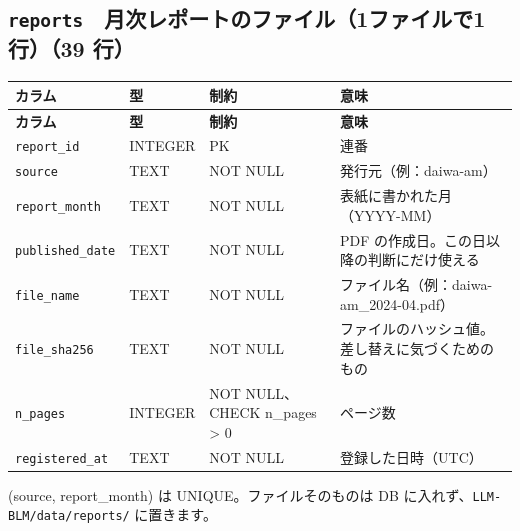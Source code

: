 \documentclass[xelatex,ja=standard,jafont=hiragino-pron,a4paper,10pt]{bxjsreport}
\begin{document}
\subsection*{\texttt{reports}　月次レポートのファイル（1ファイルで1行）（39 行）}
{\footnotesize
\begin{longtable}{p{3.30cm}p{1.40cm}p{3.00cm}p{6.40cm}}
\toprule
\textbf{カラム} & \textbf{型} & \textbf{制約} & \textbf{意味} \\
\midrule
\endfirsthead
\toprule
\textbf{カラム} & \textbf{型} & \textbf{制約} & \textbf{意味} \\
\midrule
\endhead
\bottomrule
\endfoot
\texttt{report\_\allowbreak{}id} & INTEGER & PK & 連番 \\
\texttt{source} & TEXT & NOT NULL & 発行元（例：daiwa-am） \\
\texttt{report\_\allowbreak{}month} & TEXT & NOT NULL & 表紙に書かれた月（YYYY-MM） \\
\texttt{published\_\allowbreak{}date} & TEXT & NOT NULL & PDF の作成日。この日以降の判断にだけ使える \\
\texttt{file\_\allowbreak{}name} & TEXT & NOT NULL & ファイル名（例：daiwa-am\_2024-04.pdf） \\
\texttt{file\_\allowbreak{}sha256} & TEXT & NOT NULL & ファイルのハッシュ値。差し替えに気づくためのもの \\
\texttt{n\_\allowbreak{}pages} & INTEGER & NOT NULL、CHECK n\_pages \textgreater{} 0 & ページ数 \\
\texttt{registered\_\allowbreak{}at} & TEXT & NOT NULL & 登録した日時（UTC） \\
\end{longtable}
}
{\small (source, report\_month) は UNIQUE。ファイルそのものは DB に入れず、\texttt{LLM-BLM/data/reports/} に置きます。\par}
\medskip
\end{document}
